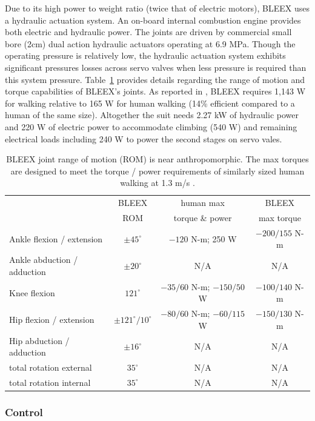 \begin{refsection}
Due to its high power to weight ratio (twice that of electric motors), BLEEX uses a hydraulic actuation system.  An on-board internal combustion engine provides both electric and hydraulic power.  The joints are driven by commercial small bore (2cm) dual action hydraulic actuators operating at 6.9 MPa. Though the operating pressure is relatively low, the hydraulic actuation system exhibits significant pressures losses across servo valves when less pressure is required than this system pressure.  Table~\ref{tab:bleex_joints} provides details regarding the range of motion and torque capabilities of BLEEX's joints.  As reported in \cite{bleex_design_2006}, BLEEX requires 1,143 W for walking relative to 165 W for human walking (14\% efficient compared to a human of the same size).  Altogether the suit needs 2.27 kW of hydraulic power and 220 W of electric power to accommodate climbing (540 W) and remaining electrical loads including 240 W to power the second stages on servo vales.

%
\begin{table}
\centering
\begin{tabular}{|l|*{3}{c|}}  %
\hline
& BLEEX & human max & BLEEX \\
& ROM & torque \& power & max torque \\ \hline
Ankle flexion / extension & $\pm 45^\circ$ & $-120$ N-m; 250 W & $-200 / 155$ N-m\\ \hline
Ankle abduction / adduction & $\pm 20^\circ$ & N/A & N/A \\ \hline
Knee flexion & $121^\circ$ & $-35 / 60$ N-m; $-150 / 50$ W & $-100 / 140$ N-m \\ \hline
Hip flexion / extension & $\pm 121^\circ / 10^\circ$ & $-80 / 60$ N-m; $-60 / 115$ W & $-150 / 130$ N-m \\ \hline
Hip abduction / adduction & $\pm 16^\circ$ & N/A & N/A\\ \hline
total rotation external & $35^\circ$ & N/A & N/A \\ \hline
total rotation internal & $35^\circ$ & N/A & N/A \\ \hline
\end{tabular}
\caption{BLEEX joint range of motion (ROM) is near anthropomorphic.  The max torques are designed to meet the torque / power requirements of similarly sized human walking at 1.3 m/s \cite{bleex_design_2006}.}\label{tab:bleex_joints}
\end{table}
%

\subsubsection{Control}


\end{refsection}
